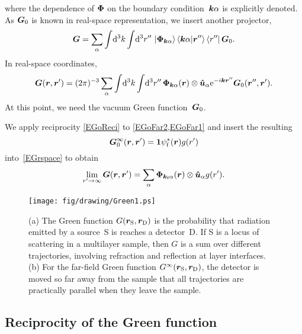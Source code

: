 where the dependence of $\bm{\Phi}$ on the boundary condition~${{\bm{k}}\alpha}$ is explicitly denoted.
As $\bm{G}_0$ is known in real-space representation, we insert another projector,
\begin{equation}
  \bm{G}  = \sum_\alpha \int\!\mathrm d^3k\int\!\mathrm d^3r''\, \ket{\bm{\Phi}_{{\bm{k}}\alpha}}\braket{{{\bm{k}}\alpha}|\bm{r}''}\bra{r''}\bm{G}_0.
\end{equation}
In real-space coordinates,
\begin{equation}\label{EGrspace}
  \TG(\r,\r')
  = (2\pi)^{-3} \sum_\alpha \int\!\d^3k\int\!\d^3r''\,
        \v\Phi_\ka(\r)\otimes \hu_\alpha \e^{-i\k\r''} \TGo(\r'',\r').
\end{equation}
At this point, we need the vacuum Green function~$\bm{G}_0$.

We apply reciprocity \cref{EGoReci}
to \cref{EGoFar2,EGoFar1} and insert the resulting
\begin{equation}
  \bm{G}_0^\infty(\bm{r},\bm{r}')=\bm{1}\psi^*_{\text{f}}(\bm{r})g(r')
\end{equation}
into~\cref{EGrspace} to obtain
%
\begin{equation}\label{EGresult}
  \lim_{r'\to\infty}\TG(\r,\r')
  = \sum_\alpha \v\Phi_{\k_\sf\alpha}(\r)\otimes \hu_\alpha g(r').
\end{equation}

\begin{figure}[tb]
\begin{center}
\texttt{[image: fig/drawing/Green1.ps]}
\end{center}
\caption{(a)
The Green function $G(\bm{r}_\text{S},\bm{r}_\text{D})$
%
is the probability that radiation emitted
by a source~S is reaches a detector~D.
If S is a locus of scattering in a multilayer sample,
then $G$ is a sum over different trajectories,
involving refraction and reflection
at layer interfaces.
(b) For the far-field
%
Green function $G^\infty(\bm{r}_\text{S},\bm{r}_\text{D})$,
the detector is moved so far away from the sample
that all trajectories are practically parallel when they leave the sample.}
\label{Fgreen1}
\end{figure}


\subsection{Reciprocity of the Green function}\label{SReci}

